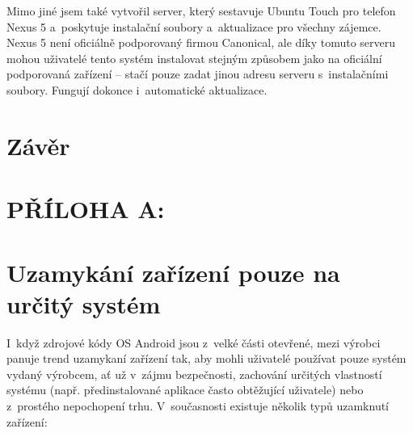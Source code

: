 \documentclass[12pt, a4paper, oneside]{article}
\begin{document}
Mimo jiné jsem také vytvořil server\cite{tasemnice-si-mail}, který sestavuje Ubuntu Touch pro telefon Nexus 5 a~poskytuje instalační soubory a~aktualizace pro všechny zájemce.  Nexus 5 není oficiálně podporovaný firmou Canonical, ale díky tomuto serveru mohou uživatelé tento systém instalovat stejným způsobem jako na oficiální podporovaná zařízení -- stačí pouze zadat jinou adresu serveru s~instalačními soubory. Fungují dokonce i~automatické aktualizace.

\newpage
\section*{Závěr}


\newpage
\section*{PŘÍLOHA A:}
\section*{Uzamykání zařízení pouze na určitý systém}
\label{sec:locked}
I~když zdrojové kódy OS Android jsou z~velké části otevřené, mezi výrobci panuje trend uzamykaní zařízení tak, aby mohli uživatelé používat pouze systém vydaný výrobcem, ať už v~zájmu bezpečnosti, zachování určitých vlastností systému (např. předinstalované aplikace často obtěžující uživatele) nebo z~prostého nepochopení trhu. V~současnosti existuje několik typů uzamknutí zařízení:
\end{document}

